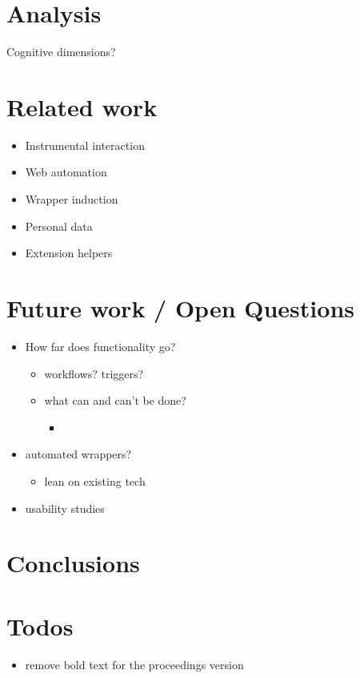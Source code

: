 \documentclass[english,submission]{programming}
\providecommand{\tightlist}{%
  \setlength{\itemsep}{0pt}\setlength{\parskip}{0pt}}
\begin{document}
\hypertarget{analysis}{%
\section{Analysis}\label{analysis}}

Cognitive dimensions?

\hypertarget{related-work}{%
\section{Related work}\label{related-work}}

\begin{itemize}
\tightlist
\item
  Instrumental interaction
\item
  Web automation
\item
  Wrapper induction
\item
  Personal data
\item
  Extension helpers
\end{itemize}

\hypertarget{future-work-open-questions}{%
\section{Future work / Open
Questions}\label{future-work-open-questions}}

\begin{itemize}
\tightlist
\item
  How far does functionality go?

  \begin{itemize}
  \tightlist
  \item
    workflows? triggers?
  \item
    what can and can't be done?

    \begin{itemize}
    \tightlist
    \item
    \end{itemize}
  \end{itemize}
\item
  automated wrappers?

  \begin{itemize}
  \tightlist
  \item
    lean on existing tech
  \end{itemize}
\item
  usability studies
\end{itemize}

\hypertarget{conclusions}{%
\section{Conclusions}\label{conclusions}}

\hypertarget{todos}{%
\section{Todos}\label{todos}}

\begin{itemize}
\tightlist
\item
  remove bold text for the proceedings version
\end{itemize}

\acks
\printbibliography
\end{document}
